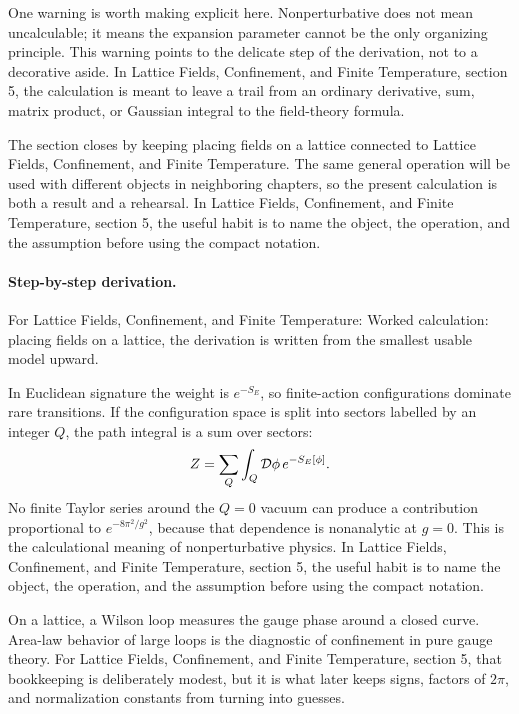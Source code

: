 One warning is worth making explicit here.  Nonperturbative does not mean uncalculable; it means the expansion parameter cannot be the only organizing principle.  This warning points to the delicate step of the derivation, not to a decorative aside.  In Lattice Fields, Confinement, and Finite Temperature, section 5, the calculation is meant to leave a trail from an ordinary derivative, sum, matrix product, or Gaussian integral to the field-theory formula.

The section closes by keeping placing fields on a lattice connected to Lattice Fields, Confinement, and Finite Temperature.  The same general operation will be used with different objects in neighboring chapters, so the present calculation is both a result and a rehearsal.  In Lattice Fields, Confinement, and Finite Temperature, section 5, the useful habit is to name the object, the operation, and the assumption before using the compact notation.



\paragraph{Step-by-step derivation.}

For Lattice Fields, Confinement, and Finite Temperature: Worked calculation: placing fields on a lattice, the derivation is written from the smallest usable model upward.

In Euclidean signature the weight is \(e^{-S_E}\), so finite-action configurations dominate rare transitions.  If the configuration space is split into sectors labelled by an integer \(Q\), the path integral is a sum over sectors:
\[
  Z=\sum_Q\int_Q\mathcal D\phi\,e^{-S_E[\phi]}.
\]
No finite Taylor series around the \(Q=0\) vacuum can produce a contribution proportional to \(e^{-8\pi^2/g^2}\), because that dependence is nonanalytic at \(g=0\).  This is the calculational meaning of nonperturbative physics.  In Lattice Fields, Confinement, and Finite Temperature, section 5, the useful habit is to name the object, the operation, and the assumption before using the compact notation.

On a lattice, a Wilson loop measures the gauge phase around a closed curve.  Area-law behavior of large loops is the diagnostic of confinement in pure gauge theory.  For Lattice Fields, Confinement, and Finite Temperature, section 5, that bookkeeping is deliberately modest, but it is what later keeps signs, factors of \(2\pi\), and normalization constants from turning into guesses.

